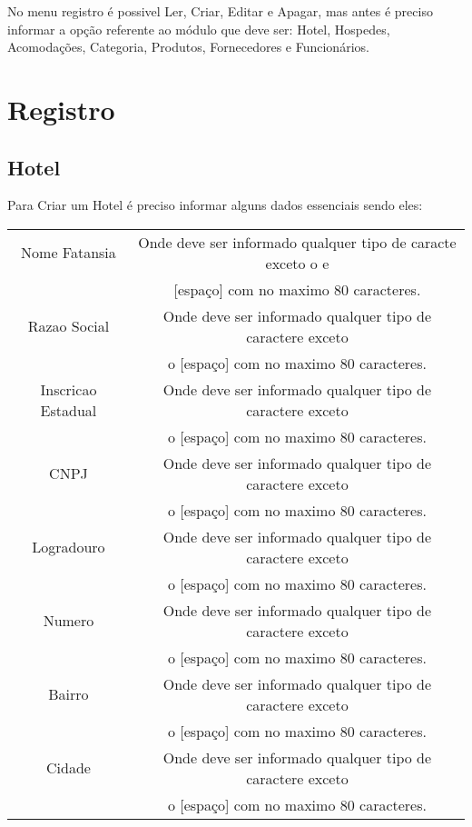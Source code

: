 \documentclass[titlepage]{article}
\begin{document}
				No menu registro é possivel Ler, Criar, Editar e Apagar, mas antes é preciso informar a opção referente ao módulo que deve ser: Hotel, Hospedes, Acomodações, Categoria, Produtos, Fornecedores e Funcionários.\\

				
				\section{Registro}
				\newpage
				\subsection{Hotel}
				Para Criar um Hotel é preciso informar alguns dados essenciais sendo eles:\\
				\begin{table}[h]%
					\begin{tabular}{|c|c|}
						\hline
						Nome Fatansia & Onde deve ser informado qualquer tipo de caracte exceto o e \\ & [espaço] com no maximo 80 caracteres.\\
						\hline
						Razao Social & Onde deve ser informado qualquer tipo de caractere exceto \\ & o [espaço] com no maximo 80 caracteres.\\
						\hline
						Inscricao Estadual & Onde deve ser informado qualquer tipo de caractere exceto \\ & o [espaço] com no maximo 80 caracteres.\\
						\hline
						CNPJ & Onde deve ser informado qualquer tipo de caractere exceto \\ & o [espaço] com no maximo 80 caracteres.\\
						\hline
						Logradouro & Onde deve ser informado qualquer tipo de caractere exceto \\ & o [espaço] com no maximo 80 caracteres.\\
						\hline
						Numero & Onde deve ser informado qualquer tipo de caractere exceto \\ & o [espaço] com no maximo 80 caracteres.\\
						\hline
						Bairro & Onde deve ser informado qualquer tipo de caractere exceto \\ & o [espaço] com no maximo 80 caracteres.\\
						\hline
						Cidade & Onde deve ser informado qualquer tipo de caractere exceto \\ & o [espaço] com no maximo 80 caracteres.\\

\end{tabular}
\end{table}
\end{document}
